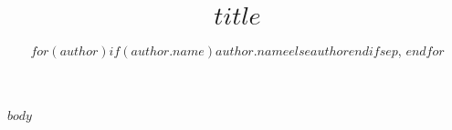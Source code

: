 \documentclass[final]{beamer}
\title{$title$}
\author{$for(author)$$if(author.name)$$author.name$$else$$author$$endif$$sep$, $endfor$}
\begin{document}
\begin{frame}{}

$body$

\end{frame}
\end{document}
